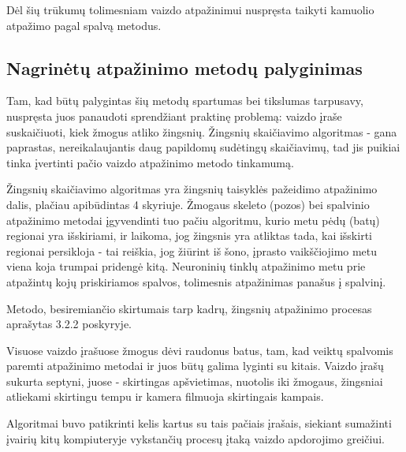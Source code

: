 \documentclass{VUMIFPSbakalaurinis}
\begin{document}
Dėl šių trūkumų tolimesniam vaizdo atpažinimui nuspręsta taikyti kamuolio atpažimo pagal spalvą metodus.

\subsection{Nagrinėtų atpažinimo metodų palyginimas}

Tam, kad būtų palygintas šių metodų spartumas bei tikslumas tarpusavy, nuspręsta juos panaudoti sprendžiant praktinę problemą: vaizdo įraše suskaičiuoti, kiek žmogus atliko žingsnių. Žingsnių skaičiavimo algoritmas - gana paprastas, nereikalaujantis daug papildomų sudėtingų skaičiavimų, tad jis puikiai tinka įvertinti pačio vaizdo atpažinimo metodo tinkamumą.  

Žingsnių skaičiavimo algoritmas yra žingsnių taisyklės pažeidimo atpažinimo dalis, plačiau apibūdintas 4 skyriuje. Žmogaus skeleto (pozos) bei spalvinio atpažinimo metodai įgyvendinti tuo pačiu algoritmu, kurio metu pėdų (batų) regionai yra išskiriami, ir laikoma, jog žingsnis yra atliktas tada, kai išskirti regionai persikloja - tai reiškia, jog žiūrint iš šono, įprasto vaikščiojimo metu viena koja trumpai pridengė kitą. Neuroninių tinklų atpažinimo metu prie atpažintų kojų priskiriamos spalvos, tolimesnis atpažinimas panašus į spalvinį.

Metodo, besiremiančio skirtumais tarp kadrų, žingsnių atpažinimo procesas aprašytas 3.2.2 poskyryje.

Visuose vaizdo įrašuose žmogus dėvi raudonus batus, tam, kad veiktų spalvomis paremti atpažinimo metodai ir juos būtų galima lyginti su kitais. Vaizdo įrašų sukurta septyni, juose - skirtingas apšvietimas, nuotolis iki žmogaus, žingsniai atliekami skirtingu tempu ir kamera filmuoja skirtingais kampais. 

Algoritmai buvo patikrinti kelis kartus su tais pačiais įrašais, siekiant sumažinti įvairių kitų kompiuteryje vykstančių procesų įtaką vaizdo apdorojimo greičiui. 
\end{document}
